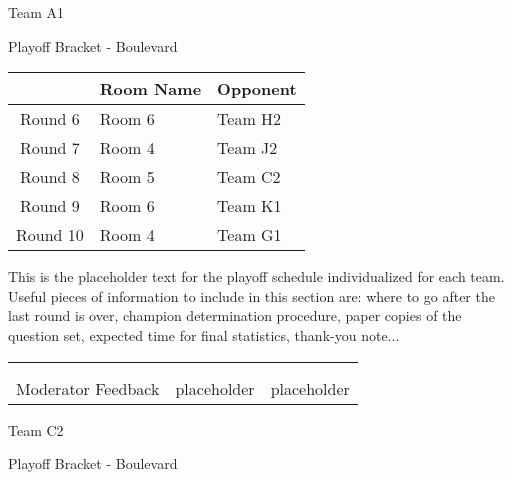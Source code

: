 \documentclass{article}%
\begin{document}
\newpage%
\begin{center}%
\begin{Huge}%
Team A1%
\end{Huge}%
\vspace*{12pt}%
\linebreak%
\begin{Large}%
Playoff Bracket {-} Boulevard%
\end{Large}%
\end{center}%
\vspace*{4pt}%
%
\begin{tabularx}{\textwidth}{|c|Y|Y|}%
\hline%
&Room Name&Opponent\\%
\hline%
Round 6&Room 6&Team H2\\%
Round 7&Room 4&Team J2\\%
Round 8&Room 5&Team C2\\%
Round 9&Room 6&Team K1\\%
Round 10&Room 4&Team G1\\%
\hline%
\end{tabularx}%
\vspace*{30pt}%
\linebreak%
This is the placeholder text for the playoff schedule individualized for each team. Useful pieces of information to include in this section are: where to go after the last round is over, champion determination procedure, paper copies of the question set, expected time for final statistics, thank{-}you note...%
\vspace*{30pt}%
\newline%
%
\begin{tabularx}{\textwidth}{YYY}%
  &  &  \\%
\\%
Moderator Feedback&placeholder&placeholder\\%
\end{tabularx}%
\newpage%
\begin{center}%
\begin{Huge}%
Team C2%
\end{Huge}%
\vspace*{12pt}%
\linebreak%
\begin{Large}%
Playoff Bracket {-} Boulevard%
\end{Large}%
\end{center}%
\end{document}
